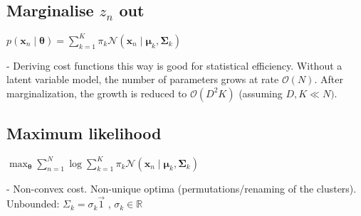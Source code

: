 
\subsection*{Marginalise $z_n$ out}


$p\left(\mathbf{x}_{n} \mid \boldsymbol{\theta}\right)=\sum_{k=1}^{K} \pi_{k} \mathcal{N}\left(\mathbf{x}_{n} \mid \boldsymbol{\mu}_{k}, \boldsymbol{\Sigma}_{k}\right)$


- Deriving cost functions this way is good for statistical efficiency. Without a latent variable model, the number of parameters grows at rate $\mathcal{O}(N)$. After marginalization, the growth is reduced to $\mathcal{O}\left(D^{2} K\right)$ (assuming $D, K \ll N)$.

\subsection*{Maximum likelihood}

$
\max _{\boldsymbol{\theta}} \sum_{n=1}^{N} \log \sum_{k=1}^{K} \pi_{k} \mathcal{N}\left(\mathbf{x}_{n} \mid \boldsymbol{\mu}_{k}, \boldsymbol{\Sigma}_{k}\right)
$

- Non-convex cost. Non-unique optima (permutations/renaming of the clusters). Unbounded: $\Sigma_k={\sigma_k}\overrightarrow{1}$ , $\sigma_k \in \mathbb{R}$

